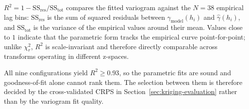 \begin{table}[ht]
    \centering
    \caption{Fitted variogram parameters for all nine
    (transform $\times$ model) configurations. Best $R^2$ within each
    transform is in bold.}
    \label{tab:variogram-params}
    \setlength{\tabcolsep}{4pt}
\end{table}

$R^2 = 1 - \mathrm{SS}_{\text{res}} / \mathrm{SS}_{\text{tot}}$ compares
the fitted variogram against the $N = 38$ empirical lag bins:
$\mathrm{SS}_{\text{res}}$ is the sum of squared residuals between
$\gamma_{\text{model}}(h_i)$ and $\hat{\gamma}(h_i)$, and
$\mathrm{SS}_{\text{tot}}$ is the variance of the empirical values
around their mean. Values close to $1$ indicate that the parametric
form tracks the empirical curve point-for-point; unlike $\chi^2_r$,
$R^2$ is scale-invariant and therefore directly comparable across
transforms operating in different z-spaces.

All nine configurations yield $R^2 \ge 0{.}93$, so the parametric
fits are sound and goodness-of-fit alone cannot rank them. The
selection between them is therefore decided by the cross-validated
CRPS in Section~\ref{sec:kriging-evaluation} rather than by the
variogram fit quality.

